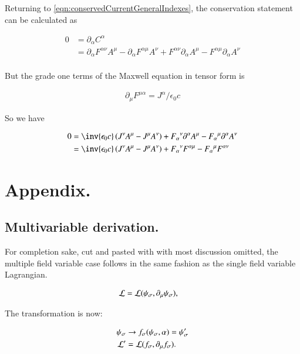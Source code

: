 \documentclass{article}
\begin{document}
Returning to \ref{eqn:conservedCurrentGeneralIndexes}, the conservation statement can be calculated as

\begin{align*}
0 &= \partial_\alpha C^\alpha \\
&= \partial_\alpha F^{\alpha\nu} A^\mu - \partial_\alpha F^{\alpha\mu} A^\nu + F^{\alpha\nu} \partial_\alpha A^\mu - F^{\alpha\mu} \partial_\alpha A^\nu  \\
\end{align*}

But the grade one terms of the Maxwell equation in tensor form is

\begin{align*}
\partial_\mu F^{\mu \alpha} = J^\alpha/\epsilon_0 c
\end{align*}

So we have 

\begin{align*}
0 
&= \inv{\epsilon_0 c} \left(J^\nu A^\mu - J^\mu A^\nu \right) + {F_{\alpha}}^{\nu} \partial^\alpha A^\mu - {F_{\alpha}}^{\mu} \partial^\alpha A^\nu  \\
&= \inv{\epsilon_0 c} \left(J^\nu A^\mu - J^\mu A^\nu \right) + {F_{\alpha}}^{\nu} F^{\alpha \mu} - {F_{\alpha}}^{\mu} F^{\alpha\nu} \\
\end{align*}

\section{ Appendix. }

\subsection{ Multivariable derivation. }

For completion sake, cut and pasted with with most discussion omitted, 
the multiple field variable case follows in the same fashion
as the single field variable Lagrangian.

\begin{align*}
\mathcal{L} &= \mathcal{L}(\psi_\sigma, \partial_\mu \psi_\sigma),
\end{align*}

The transformation is now:

\begin{align*}
\psi_\sigma &\rightarrow f_\sigma(\psi_\sigma, \alpha) = \psi_\sigma' \\
\mathcal{L}' &= \mathcal{L}(f_\sigma, \partial_\mu f_\sigma).
\end{align*}
\end{document}
